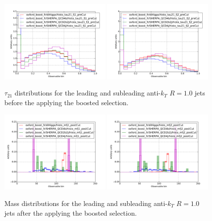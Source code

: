 \documentclass[12pt]{article}
\begin{document}
\begin{figure}[h]
\begin{center}
\includegraphics[width=0.49\textwidth]{plots/histo_tau21_fj1_preCut.pdf}
\includegraphics[width=0.49\textwidth]{plots/histo_tau21_fj2_preCut.pdf}
\caption{$\tau_{21}$ distributions for the leading and subleading anti-$k_T$ $R=1.0$ jets before the applying the boosted selection.}
\label{fig:tau21_fj_boosted_pre}
\end{center}
\end{figure}

\begin{figure}[h]
\begin{center}
\includegraphics[width=0.49\textwidth]{plots/histo_mfj1.pdf}
\includegraphics[width=0.49\textwidth]{plots/histo_mfj2.pdf}
\caption{Mass distributions for the leading and subleading anti-$k_T$ $R=1.0$ jets after the applying the boosted selection.}
\label{fig:mfj_boosted_post}
\end{center}
\end{figure}
\end{document}
